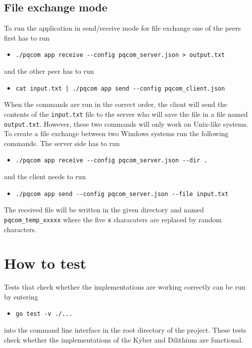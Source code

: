 \subsection{File exchange mode}
To run the application in send/receive mode for file exchange one of the peers first has to run
\begin{itemize}
  \item \texttt{./pqcom app receive -\--config pqcom\_server.json > output.txt}
\end{itemize}
and the other peer has to run
\begin{itemize}
  \item \texttt{cat input.txt | ./pqcom app send -\--config pqcom\_client.json}
\end{itemize}
When the commands are run in the correct order, the client will send the contents of the \texttt{input.txt} file to the server who will save the file in a file named \texttt{output.txt}. However, these two commands will only work on Unix-like systems. To create a file exchange between two Windows systems run the following commands. The server side has to run
\begin{itemize}
  \item \texttt{./pqcom app receive -\--config pqcom\_server.json -\--dir .}
\end{itemize}
and the client needs to run
\begin{itemize}
  \item \texttt{./pqcom app send -\--config pqcom\_server.json -\--file input.txt}
\end{itemize}
The received file will be written in the given directory and named \texttt{pqcom\_temp\_xxxxx} where the five \texttt{x} characaters are replaced by random characters.

\section{How to test}
Tests that check whether the implementations are working correctly can be run by entering
\begin{itemize}
  \item \texttt{go test -v ./...}
\end{itemize}
into the command line interface in the root directory of the project. These tests check whether the implementations of the Kyber and Dilithium are functional.

